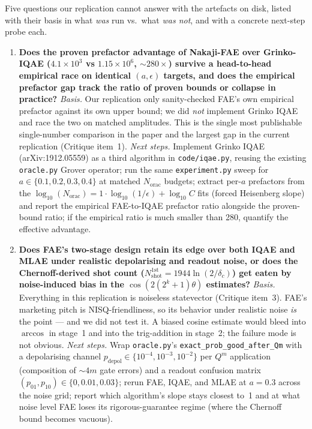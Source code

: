 Five questions our replication cannot answer with the artefacts on disk, listed with their basis in what \emph{was} run vs.\ what \emph{was not}, and with a concrete next-step probe each.

\begin{enumerate}

\item \textbf{Does the proven prefactor advantage of Nakaji-FAE over Grinko-IQAE ($4.1\times 10^{3}$ vs $1.15\times 10^{6}$, $\sim\!280\times$) survive a head-to-head empirical race on identical $(a,\epsilon)$ targets, and does the empirical prefactor gap track the ratio of proven bounds or collapse in practice?}
\emph{Basis.} Our replication only sanity-checked FAE's own empirical prefactor against its own upper bound; we did \emph{not} implement Grinko IQAE and race the two on matched amplitudes. This is the single most publishable single-number comparison in the paper and the largest gap in the current replication (Critique item~1).
\emph{Next steps.} Implement Grinko IQAE (arXiv:1912.05559) as a third algorithm in \texttt{code/iqae.py}, reusing the existing \texttt{oracle.py} Grover operator; run the same \texttt{experiment.py} sweep for $a\in\{0.1,0.2,0.3,0.4\}$ at matched $N_{\mathrm{orac}}$ budgets; extract per-$a$ prefactors from the $\log_{10}(N_{\mathrm{orac}}) = 1\cdot\log_{10}(1/\epsilon) + \log_{10} C$ fits (forced Heisenberg slope) and report the empirical FAE-to-IQAE prefactor ratio alongside the proven-bound ratio; if the empirical ratio is much smaller than 280, quantify the effective advantage.

\item \textbf{Does FAE's two-stage design retain its edge over both IQAE and MLAE under realistic depolarising and readout noise, or does the Chernoff-derived shot count ($N_{\mathrm{shot}}^{1\mathrm{st}} = 1944\ln(2/\delta_{c})$) get eaten by noise-induced bias in the $\cos(2(2^{k}+1)\theta)$ estimates?}
\emph{Basis.} Everything in this replication is noiseless statevector (Critique item~3). FAE's marketing pitch is NISQ-friendliness, so its behavior under realistic noise \emph{is} the point --- and we did not test it. A biased cosine estimate would bleed into $\arccos$ in stage~1 and into the trig-addition in stage~2; the failure mode is not obvious.
\emph{Next steps.} Wrap \texttt{oracle.py}'s \texttt{exact\_prob\_good\_after\_Qm} with a depolarising channel $p_{\mathrm{depol}} \in \{10^{-4}, 10^{-3}, 10^{-2}\}$ per $Q^{m}$ application (composition of $\sim 4m$ gate errors) and a readout confusion matrix $(p_{01},p_{10}) \in \{0, 0.01, 0.03\}$; rerun FAE, IQAE, and MLAE at $a=0.3$ across the noise grid; report which algorithm's slope stays closest to~1 and at what noise level FAE loses its rigorous-guarantee regime (where the Chernoff bound becomes vacuous).


\end{enumerate}
